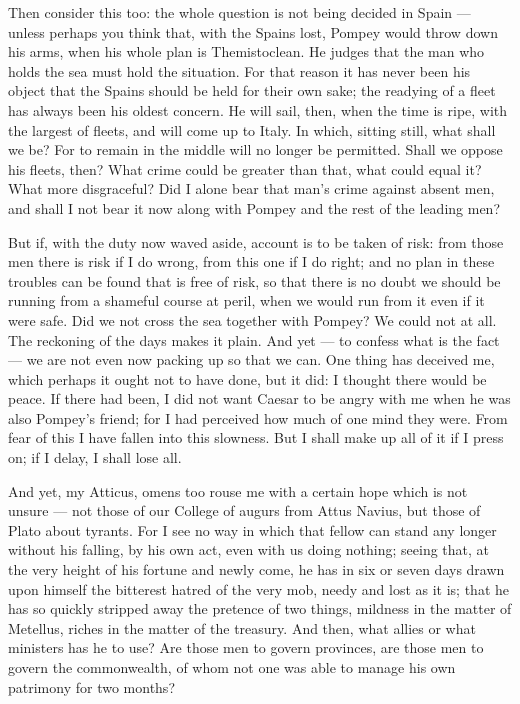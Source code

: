  Then consider this too: the whole question is not being decided in Spain --- unless perhaps you think that, with the Spains lost, Pompey would throw down his arms, when his whole plan is Themistoclean. He judges that the man who holds the sea must hold the situation. For that reason it has never been his object that the Spains should be held for their own sake; the readying of a fleet has always been his oldest concern. He will sail, then, when the time is ripe, with the largest of fleets, and will come up to Italy. In which, sitting still, what shall we be? For to remain in the middle will no longer be permitted. Shall we oppose his fleets, then? What crime could be greater than that, what could equal it? What more disgraceful? Did I alone bear that man's crime against absent men, and shall I not bear it now along with Pompey and the rest of the leading men?

 But if, with the duty now waved aside, account is to be taken of risk: from those men there is risk if I do wrong, from this one if I do right; and no plan in these troubles can be found that is free of risk, so that there is no doubt we should be running from a shameful course at peril, when we would run from it even if it were safe. \dag{}Did we not cross the sea together with Pompey? We could not at all.\dag{} The reckoning of the days makes it plain. And yet --- to confess what is the fact --- we are not even now packing up so that we can. One thing has deceived me, which perhaps it ought not to have done, but it did: I thought there would be peace. If there had been, I did not want Caesar to be angry with me when he was also Pompey's friend; for I had perceived how much of one mind they were. From fear of this I have fallen into this slowness. But I shall make up all of it if I press on; if I delay, I shall lose all.

 And yet, my Atticus, omens too rouse me with a certain hope which is not unsure --- not those of our College of augurs from Attus Navius, but those of Plato about tyrants. For I see no way in which that fellow can stand any longer without his falling, by his own act, even with us doing nothing; seeing that, at the very height of his fortune and newly come, he has in six or seven days drawn upon himself the bitterest hatred of the very mob, needy and lost as it is; that he has so quickly stripped away the pretence of two things, mildness in the matter of Metellus, riches in the matter of the treasury. And then, what allies or what ministers has he to use? Are those men to govern provinces, are those men to govern the commonwealth, of whom not one was able to manage his own patrimony for two months?


